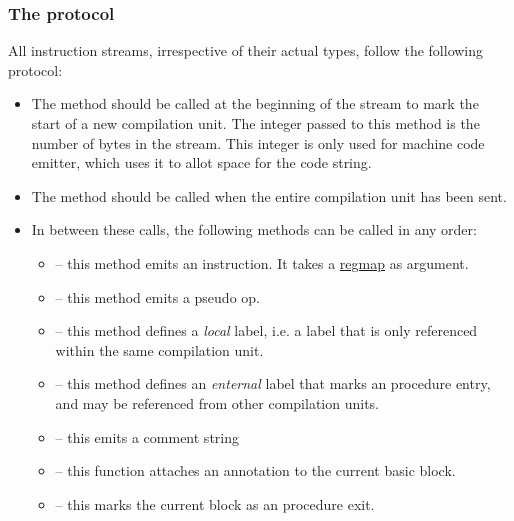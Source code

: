 \subsubsection{The protocol}
All instruction streams, irrespective of their actual types, 
follow the following protocol:
\begin{itemize}
  \item The method  should be called at the beginning of
        the stream to mark the start of a new compilation unit.  
         The integer passed to this method is the number
        of bytes in the stream.  This integer is only used for 
        machine code emitter, which uses it to allot space for the
        code string.  
  \item The method  should be called when the entire
       compilation unit has been sent.
  \item In between these calls, the following methods can be called in any
       order:
  \begin{itemize}
   \item {} -- this method emits an instruction.  It takes
         a \href{regmap.html}{regmap} as argument.
   \item {} -- this method emits a pseudo op.
   \item {} -- this method defines a \emph{local} label, i.e.
a label that is only referenced within the same compilation unit.
   \item {} -- this method defines an \emph{enternal} label that
          marks an procedure entry, and may be referenced from other 
compilation units.
   \item {} -- this emits a comment string
   \item {} -- this function attaches an annotation to 
     the current basic block.
   \item {} -- 
          this marks the current block as an procedure exit.
  \end{itemize}
\end{itemize}  
